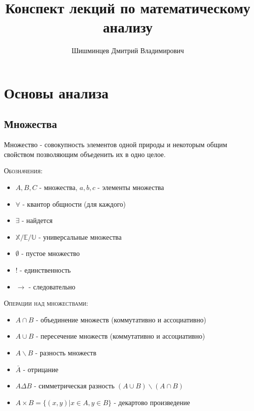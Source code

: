 \documentclass[14pt]{extreport}
\title{Конспект лекций по математическому анализу}
\author{Шишминцев Дмитрий Владимирович}
\begin{document}
    \maketitle 
    \newpage 
    \tableofcontents
    \newpage
    \chapter{Основы анализа}
        \section{Множества}
            \begin{definition}
                Множество - совокупность элементов одной природы и некоторым общим свойством позволяющим объеденить их в одно целое.    
            \end{definition}
            

            \textsc{Обозначения:}
            \begin{itemize}
                \item $A, B, C$ - множества, $a,b,c$ - элементы множества 
                \item $\forall$ - квантор общности (для каждого)
                \item $\exists$ - найдется
                \item $\mathbb{X/E/U}$ - универсальные множества 
                \item $\emptyset$ - пустое множество 
                \item ! - единственность 
                \item $\rightarrow$ - следовательно 
            \end{itemize}

            \textsc{Операции над множествами:}
            \begin{itemize}
                \item $A  \cap B$ - объединение множеств (коммутативно и ассоциативно)
                \item $A \cup B$ - пересечение множеств (коммутативно и ассоциативно)
                \item $ A \backslash B $ - разность множеств 
                \item $\bar{A}$ - отрицание
                \item $A \varDelta B$ - симметрическая разность $(A \cup B) \backslash (A \cap B)$
                \item $A \times B = \{(x,y) | x \in A, y \in B \}$ - декартово произведение
            \end{itemize}
\end{document}
